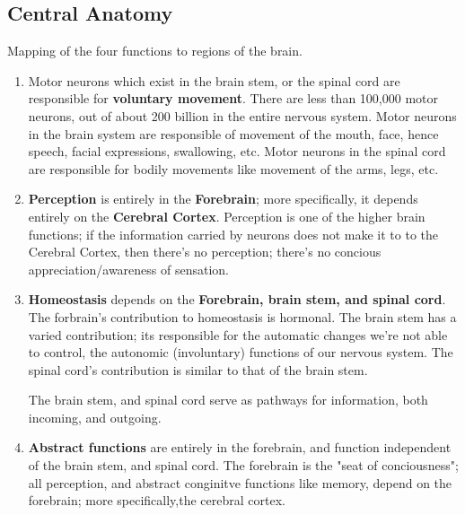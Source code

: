 \documentclass[12pt, a4paper]{article}
\begin{document}
\subsection{Central Anatomy}
Mapping of the four functions to regions of the brain.
\begin{enumerate}
    \item Motor neurons which exist in the brain stem, or the spinal cord are responsible
    for \textbf{voluntary movement}. There are less than 100,000 motor neurons, out of about 200 billion
    in the entire nervous system. Motor neurons in the brain system are responsible of movement of the mouth, face,
    hence speech, facial expressions, swallowing, etc.
    Motor neurons in the spinal cord are responsible for bodily movements like movement of the arms,
    legs, etc.
    \item \textbf{Perception} is entirely in the \textbf{Forebrain}; more specifically,  it depends entirely on the \textbf{Cerebral Cortex}.
    Perception is one of the higher brain functions; if the information carried by neurons does not 
    make it to to the Cerebral Cortex, then there's no perception; there's no concious appreciation/awareness
    of sensation.
    \item \textbf{Homeostasis} depends on the \textbf{Forebrain, brain stem, and spinal cord}.
    The forbrain's contribution to homeostasis is hormonal. The brain stem has a varied contribution; its responsible for
    the automatic changes we're not able to control, the autonomic (involuntary) functions of our nervous system. The spinal cord's
    contribution is similar to that of the brain stem.
    
    The brain stem, and spinal cord serve as pathways for information, both incoming, and outgoing. 

    \item \textbf{Abstract functions} are entirely in the forebrain, and function independent of the brain stem, and spinal cord.
    The forebrain is the "seat of conciousness"; all perception, and abstract conginitve functions like memory, depend on the forebrain;
    more specifically,the cerebral cortex.
\end{enumerate}
\end{document}

